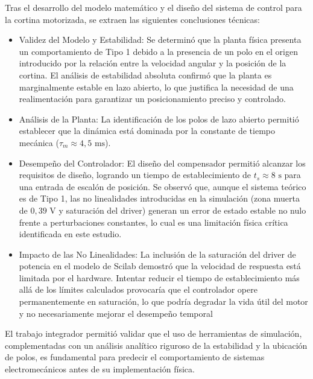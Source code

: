 Tras el desarrollo del modelo matemático y el diseño del sistema de control para la cortina motorizada, se extraen las siguientes conclusiones técnicas:
\begin{itemize}
	\item Validez del Modelo y Estabilidad: Se determinó que la planta física presenta un comportamiento de Tipo 1 debido a la presencia de un polo en el origen introducido por la relación entre la velocidad angular y la posición de la cortina. El análisis de estabilidad absoluta confirmó que la planta es marginalmente estable en lazo abierto, lo que justifica la necesidad de una realimentación para garantizar un posicionamiento preciso y controlado.
	
	\item Análisis de la Planta: La identificación de los polos de lazo abierto permitió establecer que la dinámica está dominada por la constante de tiempo mecánica ($\tau_m \approx 4,5 \text{ ms}$).
	
	\item Desempeño del Controlador: El diseño del compensador permitió alcanzar los requisitos de diseño, logrando un tiempo de establecimiento de $t_s \approx 8 \text{ s}$ para una entrada de escalón de posición. Se observó que, aunque el sistema teórico es de Tipo 1, las no linealidades introducidas en la simulación (zona muerta de $0,39 \text{ V}$ y saturación del driver) generan un error de estado estable no nulo frente a perturbaciones constantes, lo cual es una limitación física crítica identificada en este estudio.
	
	\item Impacto de las No Linealidades: La inclusión de la saturación del driver de potencia en el modelo de Scilab demostró que la velocidad de respuesta está limitada por el hardware. Intentar reducir el tiempo de establecimiento más allá de los límites calculados provocaría que el controlador opere permanentemente en saturación, lo que podría degradar la vida útil del motor y no necesariamente mejorar el desempeño temporal
	
\end{itemize}
	
	El trabajo integrador permitió validar que el uso de herramientas de simulación, complementadas con un análisis analítico riguroso de la estabilidad y la ubicación de polos, es fundamental para predecir el comportamiento de sistemas electromecánicos antes de su implementación física.
	

